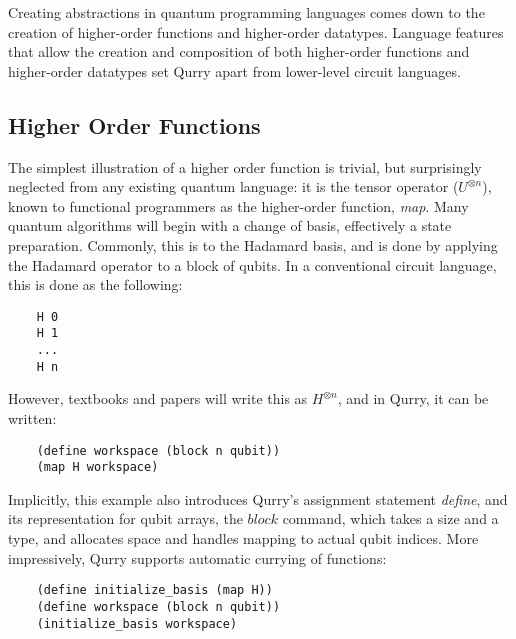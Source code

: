 \documentclass[journal]{article}
\begin{document}
    Creating abstractions in quantum programming languages comes down to the creation of higher-order functions and higher-order datatypes.
    Language features that allow the creation and composition of both higher-order functions and higher-order datatypes set Qurry apart from lower-level circuit languages.

    \subsection{Higher Order Functions}

    The simplest illustration of a higher order function is trivial, but surprisingly neglected from any existing quantum language: it is the tensor operator ($U^{\otimes n}$), known to functional programmers as the higher-order function, \emph{map}.
    Many quantum algorithms will begin with a change of basis, effectively a state preparation. 
    Commonly, this is to the Hadamard basis, and is done by applying the Hadamard operator to a block of qubits.
    In a conventional circuit language, this is done as the following:
    \begin{verbatim}
    H 0
    H 1
    ...
    H n\end{verbatim}
    However, textbooks and papers will write this as $H^{\otimes n}$, and in Qurry, it can be written:
    \begin{verbatim}
    (define workspace (block n qubit))
    (map H workspace)\end{verbatim}
    Implicitly, this example also introduces Qurry's assignment statement \emph{define}, and its representation for qubit arrays, the $block$ command, which takes a size and a type, and allocates space and handles mapping to actual qubit indices.
    More impressively, Qurry supports automatic currying of functions:
    \begin{verbatim}
    (define initialize_basis (map H))
    (define workspace (block n qubit))
    (initialize_basis workspace)\end{verbatim}
\end{document}
